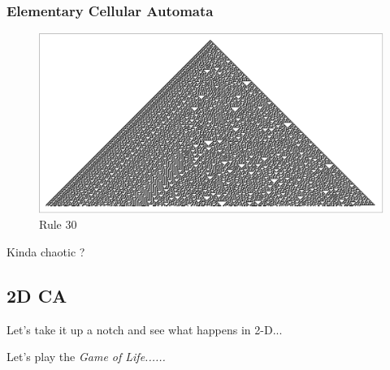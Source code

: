\documentclass{beamer}
\begin{document}

\begin{frame}
    \frametitle{Elementary Cellular Automata}
    \begin{figure}
        \includegraphics[scale=0.39]{rule30.pdf}
        \caption{Rule 30}
    \end{figure}
    Kinda chaotic ?
\end{frame}
\subsection{2D CA}

\begin{frame}
    \centering \LARGE
    Let's take it up a notch and see what happens in 2-D...
\end{frame}

\begin{frame}
    \centering \Large
    Let's play the \textit{Game of Life......}
\end{frame}
\end{document}
